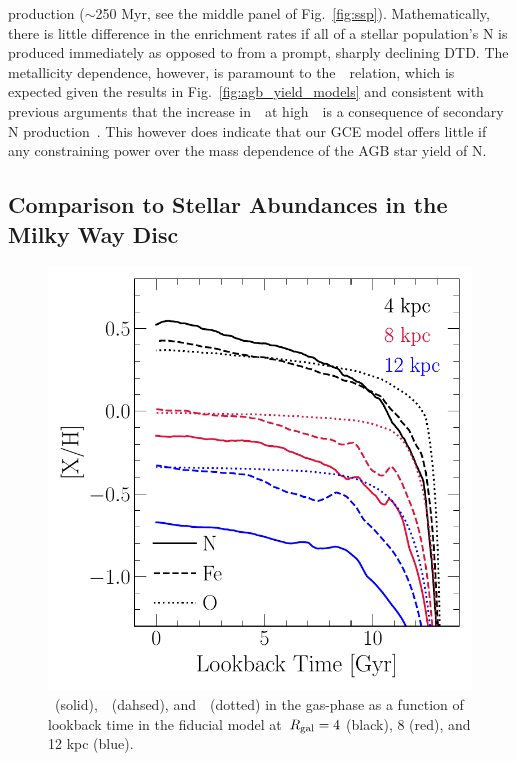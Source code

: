 \documentclass[ms.tex]{subfiles}
\begin{document}
production ($\sim$250 Myr, see the middle panel of Fig.~\ref{fig:ssp}).
Mathematically, there is little difference in the enrichment rates if all of a
stellar population's N is produced immediately as opposed to from a prompt,
sharply declining DTD.
The metallicity dependence, however, is paramount to the~\ohno~relation, which
is expected given the results in Fig.~\ref{fig:agb_yield_models} and consistent
with previous arguments that the increase in~\no~at high~\oh~is a consequence
of secondary N production~\citep{VilaCostas1993, vanZee1998, Henry1999,
PerezMontero2009, Berg2012, Pilyugin2012, Andrews2013, HaydenPawson2021}.
This however does indicate that our GCE model offers little if any
constraining power over the mass dependence of the AGB star yield of N.


\subsection{Comparison to Stellar Abundances in the Milky Way Disc}
\label{sec:results:vincenzo_comp}

\begin{figure}
\centering
\includegraphics[scale = 0.63]{nh_feh_vs_lookback.pdf}
\caption{
\nh~(solid),~\feh~(dahsed), and~\oh~(dotted) in the gas-phase as a function of
lookback time in the fiducial model at~$R_\text{gal} = 4$ (black), 8 (red), and 12 kpc
(blue).
}
\label{fig:nh_feh_vs_lookback}
\end{figure}
\end{document}
